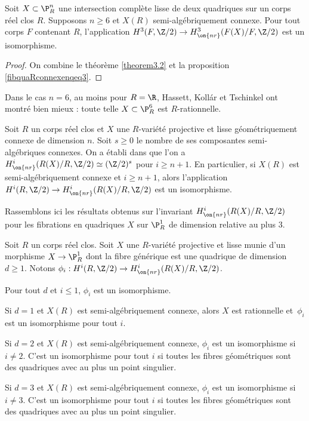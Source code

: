 \begin{cor}
Soit $X \subset \P^n_R$ une intersection complète lisse de deux quadriques sur un corps réel clos $R$. Supposons $n \geq 6$ et $X(R)$ semi-algébriquement connexe.
Pour tout corps $F$ contenant $R$, l'application
$H^3(F,\Z/2) \to H^3_{\on{nr}}(F(X)/F, \Z/2)$ est un isomorphisme.
\end{cor}
\begin{proof}

On combine le théorème \ref{theorem3.2} et la proposition \ref{fibquaRconnexenqeq3}.
\end{proof}

\begin{rmk}
Dans le cas $n=6$, au moins pour $R=\R$, Hassett, Kollár et Tschinkel \cite{hassett2022rationality}
ont montré bien mieux : toute telle $X \subset \P^6_{R}$ est $R$-rationnelle.
\end{rmk}

Soit $R$ un corps réel clos et $X$ une $R$-variété projective et lisse géométriquement connexe de dimension $n$.
Soit $s\geq 0$ le nombre de ses composantes semi-algébriques connexes.
On a établi dans \cite{colliot1990real} que l'on a
$ H^{i}_{\on{nr}}(R(X)/R,\Z/2) \simeq (\Z/2)^s $
pour $i\geq n+1$. En particulier, si $X(R)$ est semi-algébriquement connexe et $i\geq n+1$, alors l'application $H^i(R,\Z/2)\to H^i_{\on{nr}}(R(X)/R,\Z/2)$ est un isomorphisme.

Rassemblons ici les résultats
obtenus sur l'invariant $ H^{i}_{\on{nr}}(R(X)/R,\Z/2)$
pour les fibrations en quadriques $X$ sur $\P^1_R$
de dimension relative au plus $3$.

\begin{cor}
Soit $R$ un corps réel clos.
Soit $X$ une $R$-variété projective et lisse munie d'un
morphisme $X \to \P^1_{R}$ dont la fibre générique est une quadrique de dimension $d\geq 1$.
Notons $\phi_i : H^{i}(R,\Z/2) \to H^{i}_{\on{nr}}(R(X)/R,\Z/2)$.
\begin{enumeratea}
\item
Pour tout $d$ et $i\leq 1$, $\phi_i$ est un isomorphisme.

\item
Si $d=1$ et $X(R)$ est semi-algébriquement connexe,
alors $X$ est rationnelle et~$\phi_i$ est un isomorphisme pour tout $i$.

\item
Si $d=2$ et $X(R)$ est semi-algébriquement connexe,
$\phi_i$ est un isomorphisme si $i\neq 2$. C'est un isomorphisme pour tout $i$ si toutes les fibres géométriques sont des quadriques avec au plus un point singulier.

\item
Si $d=3$ et $X(R)$ est semi-algébriquement connexe, $\phi_i$ est un isomorphisme si $i\neq 3$. C'est un isomorphisme pour tout $i$ si toutes les fibres géométriques sont des quadriques avec au plus un point singulier.
\end{enumeratea}
\end{cor}

